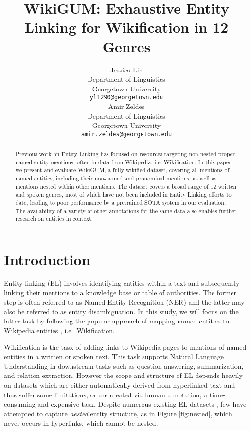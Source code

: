 \documentclass[11pt,a4paper]{article}
\title{WikiGUM: Exhaustive Entity Linking for Wikification in 12 Genres}
\author{Jessica Lin \\
   Department of Linguistics \\
  Georgetown University \\
  \texttt{yl1290@georgetown.edu} \\\And
  Amir Zeldes \\
   Department of Linguistics \\
  Georgetown University \\
  \texttt{amir.zeldes@georgetown.edu} \\}
\date{}
\begin{document}
\maketitle



\begin{abstract}
Previous work on Entity Linking has focused on resources targeting non-nested proper named entity mentions, often in data from Wikipedia, i.e. Wikification. In this paper, we present and evaluate WikiGUM, a fully wikified dataset, covering all mentions of named entities, including their non-named and pronominal mentions, as well as mentions nested within other mentions. The dataset covers a broad range of 12 written and spoken genres, most of which have not been included in Entity Linking efforts to date, leading to poor performance by a pretrained SOTA system in our evaluation. The availability of a variety of other annotations for the same data also enables further research on entities in context. 
\end{abstract}


\section{Introduction}

Entity linking (EL) involves identifying entities within a text and subsequently linking their mentions to a knowledge base or table of authorities. The former step is often referred to as Named Entity Recognition (NER) and the latter may also be referred to as entity disambiguation. In this study, we will focus on the latter task by following the popular approach of mapping named entities to Wikipedia entities \cite{milne2008aquaint,shnayderman2019fast}, i.e.~Wikification. 

Wikification is the task of adding links to Wikipedia pages to mentions of named entities in a written or spoken text. This task supports Natural Language Understanding in downstream tasks such as question answering, summarization, and relation extraction. However the scope and structure of EL depends heavily on datasets which are either automatically derived from hyperlinked text and thus suffer some limitations, or are created via human annotation, a time-consuming and expensive task. Despite numerous existing EL datasets \cite{cucerzan2007msnbc,ji2015tackbp15,kulkarni2009iitb,milne2008aquaint,ratinov2011ace}, few  have attempted to capture \textit{nested} entity structure, as in Figure \ref{fig:nested}, which never occurs in hyperlinks, which cannot be nested. 
\end{document}
